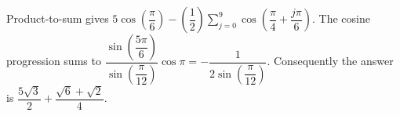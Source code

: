 Product-to-sum gives $5 \cos (\dfrac{\pi}{6}) - (\dfrac{1}{2}) \sum_{j=0}^9 \cos (\dfrac{\pi}{4} + \dfrac{j \pi}{6})$. The cosine progression sums to $\dfrac{\sin (\dfrac{5 \pi}{6})}{\sin (\dfrac{\pi}{12})} \cos \pi = - \dfrac{1}{2 \sin (\dfrac{\pi}{12})}$. Consequently the answer is $\boxed{\dfrac{5 \sqrt{3}}{2} + \dfrac{\sqrt6+\sqrt2}{4}}$.
